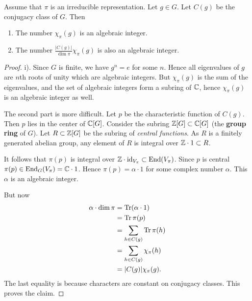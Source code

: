 \documentclass[11pt, english]{article}
\begin{document}
\begin{prop}
 Assume that $\pi$ is an irreducible representation. Let $g \in G$. Let $C(g)$ be the conjugacy class of $G$. Then
 \begin{enumerate}
 \item The number $\chi_\pi(g)$ is an algebraic integer.
\item The number $\frac{\lvert C(g) \rvert}{\dim \pi} \chi_\pi(g)$ is also an algebraic integer.
 \end{enumerate}
\end{prop}
\begin{proof}
i). Since $G$ is finite, we have $g^n=e$ for some $n$. Hence all eigenvalues of $g$ are $n$th roots of unity which are algebraic integers. But $\chi_\pi(g)$ is the sum of the eigenvalues, and the set of algebraic integers form a subring of $\mathbb{C}$, hence $\chi_\pi(g)$ is an algebraic integer as well.

The second part is more difficult. Let $p$ be the characteristic function of $C(g)$. Then $p$ lies in the center of $\mathbb{C}[G]$. Consider the subring $\mathbb{Z}[G] \subset \mathbb{C}[G]$ (the \textbf{group ring} of $G$). Let $R \subset \mathbb{Z}[G]$ be the subring of \emph{central functions}. As $R$ is a finitely generated abelian group, any element of $R$ is integral over $\mathbb{Z} \cdot 1 \subset R$. 

It follows that $\pi(p)$ is integral over $\mathbb{Z} \cdot \text{id}_{V_\pi} \subset \operatorname{End}(V_\pi)$. Since $p$ is central $\pi(p) \in \operatorname{End}_G(V_\pi)=\mathbb{C} \cdot 1$. Hence $\pi(p) = \alpha \cdot 1$ for some complex number $\alpha$. This $\alpha$ is an algebraic integer.

But now
\begin{align*}
  \alpha \cdot \dim \pi &= \operatorname{Tr}( \alpha \cdot 1) \\
&= \operatorname{Tr} \pi(p) \\
&= \sum_{h \in C(g)} \operatorname{Tr} \pi(h) \\
&= \sum_{h \in C(g)} \chi_\pi(h) \\
&= \lvert C(g) \rvert \chi_\pi(g).
\end{align*}
The last equality is because characters are constant on conjugacy classes. This proves the claim.
\end{proof}
\end{document}
